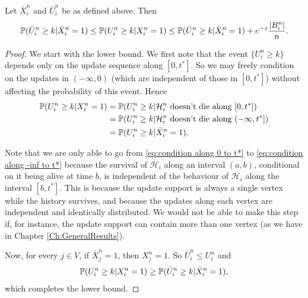 	\begin{lemma}
	\label{lem: bound U by U bar}
	Let $\bar{X}_i^n$ and $\bar{U}_i^n$ be as defined above. Then
		\begin{equation}
			\mathbb{P}(\bar{U}_i^n \geq k | \bar{X}_i^n = 1) \leq \mathbb{P}(U_i^n \geq k | X_i^n = 1) \leq \mathbb{P}(\bar{U}_i^n \geq k | \bar{X}_i^n = 1) + e^{-z} \frac{|B_i^n|}{n}.
		\end{equation}
	\end{lemma}
	\begin{proof}
		We start with the lower bound. We first note that the event $\{U_i^n \geq k\}$ depends only on the update sequence along $[0, t^*]$. So we may freely condition on the updates in $(-\infty, 0)$ (which are independent of those in $[0, t^*]$) without affecting the probability of this event. Hence
		\begin{align}
			\mathbb{P}(U_i^n \geq k | X_i^n = 1) &= \mathbb{P}(U_i^n \geq k | \mathcal{H}_i^n \text{ doesn't die along } [0, t^*]) \label{eq:condition along 0 to t*}\\
			&= \mathbb{P}(U_i^n \geq k | \mathcal{H}_i^n \text{ doesn't die along } (-\infty, t^*]) \label{eq:condition along -inf to t*}\\
			&= \mathbb{P}(U_i^n \geq k | \bar{X}_i^n = 1).
		\end{align}

		Note that we are only able to go from \eqref{eq:condition along 0 to t*} to \eqref{eq:condition along -inf to t*} because the survival of $\mathcal{H}_i$ along an interval $(a, b)$, conditional on it being alive at time $b$, is independent of the behaviour of $\mathcal{H}_i$ along the interval $[b, t^*]$. This is because the update support is always a single vertex while the history survives, and because the updates along each vertex are independent and identically distributed. We would not be able to make this step if, for instance, the update support can contain more than one vertex (as we have in Chapter \ref{Ch:GeneralResults}).

		Now, for every $j \in V$, if $\bar{X}_j^n = 1$, then $X_j^n = 1$. So $\bar{U}_i^n \leq U_i^n$ and
		\begin{equation}
			\mathbb{P}(U_i^n \geq k | X_i^n = 1) \geq \mathbb{P}(\bar{U}_i^n \geq k | \bar{X}_i^n = 1),
		\end{equation}
		which completes the lower bound.


\end{proof}
